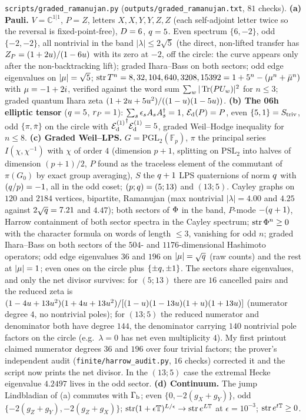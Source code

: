 \begin{numerical}
\label{num:graded-ramanujan}
\texttt{scripts/graded\_ramanujan.py} (\texttt{outputs/graded\_ramanujan.txt}, $81$ checks).
\textbf{(a) Pauli.} $V = \mathbb C^{1|1}$, $P = Z$, letters $X,X,Y,Y,Z,Z$ (each self-adjoint letter
twice so the reversal is fixed-point-free), $D = 6$, $q = 5$. Even spectrum $\{6,-2\}$, odd
$\{-2,-2\}$, all nontrivial in the band $|\lambda|\le2\sqrt5$ (the direct, non-lifted transfer has
$Z_P = (1+2u)/(1-6u)$ with its zero at $-2$, off the circle: the curve appears only after the
non-backtracking lift); graded Ihara--Bass on both sectors;
odd edge eigenvalues on $|\mu| = \sqrt5$; $\operatorname{str}T^n = 8,32,104,640,3208,15392 = 1+5^n-
(\mu^n+\bar{\mu}^n)$ with $\mu = -1+2i$, verified against the word sum
$\sum_w|\operatorname{Tr}(PU_w)|^2$ for $n\le3$; graded quantum Ihara zeta $(1+2u+5u^2)/((1-u)(1-5u))$.
\textbf{(b) The 06h elliptic tensor} ($q = 5$, $r_{P} = 1$): $\sum_s\epsilon_sA_{s}A_{s}^\dagger
= 1$, $\mathcal E_{\mathrm d}(P) = P$, even $\{5,1\} = S_{\mathrm{triv}}$, odd $\{\pi,\bar\pi\}$ on the circle with
${\mathcal E_{\mathrm d}^{(1)}}^\dagger{\mathcal E_{\mathrm d}^{(1)}} = 5$, graded Weil--Hodge inequality for $n\le8$.
\textbf{(c) Graded Weil--LPS.} $G = \mathrm{PGL}_2(\mathbb F_p)$, $\pi$ the principal series
$I(\chi,\chi^{-1})$ with $\chi$ of order $4$ (dimension $p+1$, splitting on $\mathrm{PSL}_2$ into
halves of dimension $(p+1)/2$, $P$ found as the traceless element of the commutant of $\pi(G_0)$ by
exact group averaging), $S$ the $q+1$ LPS quaternions of norm $q$ with $(q/p) = -1$, all in
the odd coset; $(p;q) = (5;13)$ and $(13;5)$. Cayley graphs on $120$ and $2184$ vertices,
bipartite, Ramanujan (max nontrivial $|\lambda| = 4.00$ and $4.25$ against $2\sqrt{q} = 7.21$ and
$4.47$); both sectors of $\Phi$ in the band, $P$-mode $-(q+1)$, Harrow containment of both sector
spectra in the Cayley spectrum; $\operatorname{str}\Phi^n\ge0$ with the character formula on words of length
$\le3$, vanishing for odd $n$; graded Ihara--Bass on both sectors of the $504$- and $1176$-dimensional
Hashimoto operators; odd edge eigenvalues $36$ and $196$ on $|\mu| = \sqrt{q}$ (raw counts) and the rest at
$|\mu| = 1$; even ones on the circle plus $\{\pm q,\pm1\}$. The sectors share eigenvalues,
and only the net divisor survives: for $(5;13)$ there are $16$ cancelled pairs and the reduced
zeta is $(1-4u+13u^2)(1+4u+13u^2)/[(1-u)(1-13u)(1+u)(1+13u)]$ (numerator degree
$4$, no nontrivial poles); for $(13;5)$ the reduced numerator and denominator both have degree
$144$, the denominator carrying $140$ nontrivial pole factors on the circle (e.g.\ $\lambda = 0$
has net even multiplicity $4$). My first printout claimed numerator degrees $36$ and $196$ over four
trivial factors; the prover's independent audit (\texttt{finite/harrow\_audit.py}, $16$ checks)
corrected it and the script now prints the net divisor. In the $(13;5)$ case the extremal Hecke
eigenvalue $4.2497$ lives in the odd sector.
\textbf{(d) Continuum.} The jump Lindbladian of (a) commutes with $\Gamma_{\mathrm b}$; even $\{0,-2(g_X+g_Y)\}$,
odd $\{-2(g_Z+g_Y),-2(g_Z+g_X)\}$; $\operatorname{str}(1+\epsilon\mathbb T)^{L/\epsilon}\to\operatorname{str} e^{L\mathbb T}$ at
$\epsilon = 10^{-3}$; $\operatorname{str} e^{t\mathbb T}\ge0$.
\end{numerical}

